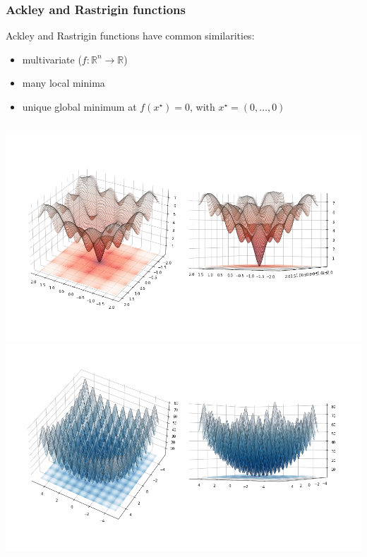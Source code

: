 \documentclass{beamer}
\begin{document}
\begin{frame}
\frametitle{Ackley and Rastrigin functions}
Ackley and Rastrigin functions have common similarities:
  \begin{itemize}
    \item multivariate ($f:\mathbb{R}^n \rightarrow \mathbb{R}$)
    \item many local minima
    \item unique global minimum at $f(x^{\star}) = 0$, with $x^{\star} = (0, \dots, 0)$
  \end{itemize}
  \begin{columns}[t]
      \centering
      \includegraphics[width=1.0\textwidth]{figures/introduction-ackley}
      \centering
      \includegraphics[width=1.0\textwidth]{figures/introduction-rastrigin}
  \end{columns}
\end{frame}
\end{document}
